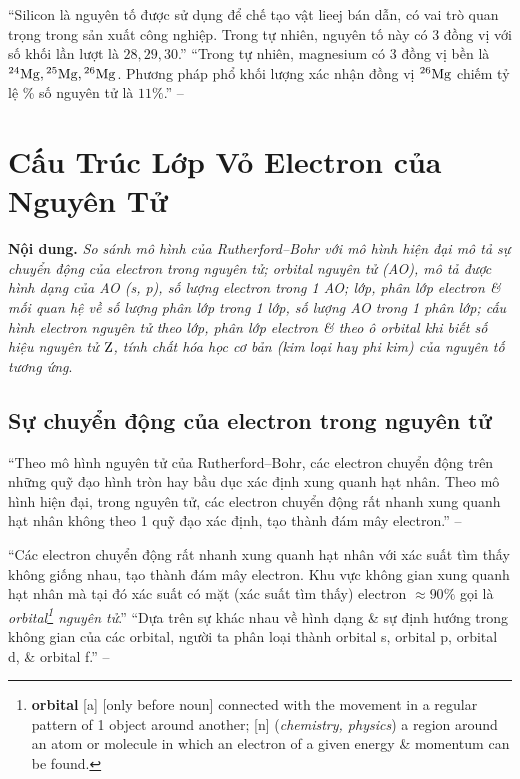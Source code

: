 \documentclass[oneside]{book}
\numberwithin{equation}{section}
\begin{document}
``Silicon là nguyên tố được sử dụng để chế tạo vật lieej bán dẫn, có vai trò quan trọng trong sản xuất công nghiệp. Trong tự nhiên, nguyên tố này có 3 đồng vị với số khối lần lượt là $28,29,30$.'' ``Trong tự nhiên, magnesium có 3 đồng vị bền là $\rm{}^{24}Mg,{}^{25}Mg,{}^{26}Mg$. Phương pháp phổ khối lượng xác nhận đồng vị $\rm{}^{26}Mg$ chiếm tỷ lệ \% số nguyên tử là $11\%$.'' -- \cite[p. 25]{SGK_Hoa_Hoc_10_Chan_Troi_Sang_Tao}


\section{Cấu Trúc Lớp Vỏ Electron của Nguyên Tử}
\textbf{Nội dung.} \textit{So sánh mô hình của Rutherford--Bohr với mô hình hiện đại mô tả sự chuyển động của electron trong nguyên tử; orbital nguyên tử (AO), mô tả được hình dạng của AO (s, p), số lượng electron trong 1 AO; lớp, phân lớp electron \& mối quan hệ về số lượng phân lớp trong 1 lớp, số lượng AO trong 1 phân lớp; cấu hình electron nguyên tử theo lớp, phân lớp electron \& theo ô orbital khi biết số hiệu nguyên tử $\rm Z$, tính chất hóa học cơ bản (kim loại hay phi kim) của nguyên tố tương ứng}.

\subsection{Sự chuyển động của electron trong nguyên tử}
``Theo mô hình nguyên tử của Rutherford--Bohr, các electron chuyển động trên những quỹ đạo hình tròn hay bầu dục xác định xung quanh hạt nhân. Theo mô hình hiện đại, trong nguyên tử, các electron chuyển động rất nhanh xung quanh hạt nhân không theo 1 quỹ đạo xác định, tạo thành đám mây electron.'' -- \cite[p. 27]{SGK_Hoa_Hoc_10_Chan_Troi_Sang_Tao}

``Các electron chuyển động rất nhanh xung quanh hạt nhân với xác suất tìm thấy không giống nhau, tạo thành đám mây electron. Khu vực không gian xung quanh hạt nhân mà tại đó xác suất có mặt (xác suất tìm thấy) electron $\approx90\%$ gọi là \textit{orbital\footnote{\textbf{orbital} [a] [only before noun] connected with the movement in a regular pattern of 1 object around another; [n] (\textit{chemistry, physics}) a region around an atom or molecule in which an electron of a given energy \& momentum can be found.} nguyên tử}.'' ``Dựa trên sự khác nhau về hình dạng \& sự định hướng trong không gian của các orbital, người ta phân loại thành orbital s, orbital p, orbital d, \& orbital f.'' -- \cite[p. 27]{SGK_Hoa_Hoc_10_Chan_Troi_Sang_Tao}
\end{document}
